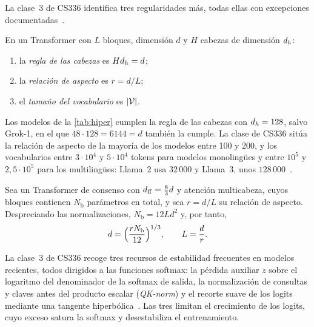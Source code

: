 La clase~3 de CS336 identifica tres regularidades más, todas ellas con excepciones documentadas~\cite{cs336}.

\begin{definicion}\label{def:forma}
En un Transformer con $L$ bloques, dimensión $d$ y $H$ cabezas de dimensión $d_{h}$:
\begin{enumerate}
  \item la \emph{regla de las cabezas} es $Hd_{h}=d$;
  \item la \emph{relación de aspecto} es $r=d/L$;
  \item el \emph{tamaño del vocabulario} es $\lvert\mathcal{V}\rvert$.
\end{enumerate}
\end{definicion}

Los modelos de la \cref{tab:hiper} cumplen la regla de las cabezas con $d_{h}=128$, salvo Grok-1, en el que $48\cdot 128=6144=d$ también la cumple. La clase de CS336 sitúa la relación de aspecto de la mayoría de los modelos entre 100 y 200, y los vocabularios entre $3\cdot 10^{4}$ y $5\cdot 10^{4}$ tokens para modelos monolingües y entre $10^{5}$ y $2{,}5\cdot 10^{5}$ para los multilingües: Llama~2 usa $32\,000$ y Llama~3, unos $128\,000$~\cite{cs336,llama3}.

\begin{proposicion}\label{prop:aspecto}
Sea un Transformer de consenso con $d_{\mathrm{ff}}=\frac83 d$ y atención multicabeza, cuyos bloques contienen $N_{\mathrm{b}}$ parámetros en total, y sea $r=d/L$ su relación de aspecto. Despreciando las normalizaciones, $N_{\mathrm{b}}=12Ld^{2}$ y, por tanto,
\[
d=\Bigl(\frac{rN_{\mathrm{b}}}{12}\Bigr)^{1/3},\qquad L=\frac dr .
\]
\end{proposicion}

\addtocounter{definicion}{1}%

\begin{observacion}[Estabilidad]
La clase~3 de CS336 recoge tres recursos de estabilidad frecuentes en modelos recientes, todos dirigidos a las funciones softmax: la pérdida auxiliar $z$ sobre el logaritmo del denominador de la softmax de salida, la normalización de consultas y claves antes del producto escalar (\emph{QK-norm}) y el recorte suave de los logits mediante una tangente hiperbólica~\cite{cs336}. Las tres limitan el crecimiento de los logits, cuyo exceso satura la softmax y desestabiliza el entrenamiento.
\end{observacion}

